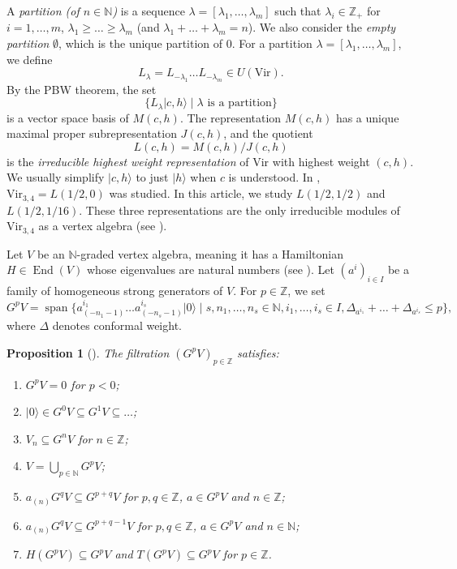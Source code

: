 \documentclass[a4paper, 12pt, reqno]{amsart}
\newtheorem{proposition}[theorem]{Proposition}
\theoremstyle{remark}
\DeclareMathOperator{\End}{End}
\DeclareMathOperator{\vspan}{span}
\newcommand{\vac}{{|0\rangle}}
\newcommand{\Vir}{{\mathrm{Vir}}}
\begin{document}
A \emph{partition (of $n \in \mathbb{N}$)} is a sequence $\lambda = [\lambda_1, \dots, \lambda_m]$ such that $\lambda_i \in \mathbb{Z}_+$ for $i = 1, \dots, m$, $\lambda_1 \ge \dots \ge \lambda_m$ (and $\lambda_1 + \dots + \lambda_m = n$).
We also consider the \emph{empty partition} $\emptyset$, which is the unique partition of $0$.
For a partition $\lambda = [\lambda_1, \dots, \lambda_m]$, we define
\begin{equation*}
  L_{\lambda} = L_{-\lambda_1}\dots L_{-\lambda_m} \in U(\Vir).
\end{equation*}
By the PBW theorem, the set
\begin{equation*}
  \{L_{\lambda}|c, h\rangle \mid \text{$\lambda$ is a partition}\}
\end{equation*}
is a vector space basis of $M(c, h)$.
The representation $M(c, h)$ has a unique maximal proper subrepresentation $J(c, h)$, and the quotient
\begin{equation*}
  L(c, h) = M(c, h)/J(c, h)
\end{equation*}
is the \emph{irreducible highest weight representation} of $\Vir$ with highest weight $(c, h)$.
We usually simplify $|c, h\rangle$ to just $|h\rangle$ when $c$ is understood.
In \cite{andrews_singular_2022}, $\Vir_{3, 4} = L(1/2, 0)$ was studied.
In this article, we study $L(1/2, 1/2)$ and $L(1/2, 1/16)$.
These three representations are the only irreducible modules of $\Vir_{3, 4}$ as a vertex algebra (see \cite[Theorem 4.2]{wang_rationality_1993}).

Let $V$ be an $\mathbb{N}$-graded vertex algebra, meaning it has a Hamiltonian $H \in \End(V)$ whose eigenvalues are natural numbers (see \cite[\S1.6]{de_sole_finite_2006}).
Let $(a^i)_{i \in I}$ be a family of homogeneous strong generators of $V$.
For $p \in \mathbb{Z}$, we set
\begin{equation*}
  G^pV = \vspan\{a^{i_1}_{(-n_1 - 1)}\dots a^{i_s}_{(-n_s - 1)}\vac \mid s, n_1, \dots, n_s \in \mathbb{N}, i_1, \dots, i_s \in I, \Delta_{a^{i_1}} + \dots + \Delta_{a^{i_s}} \le p\},
\end{equation*}
where $\Delta$ denotes conformal weight.

\begin{proposition}[{\cite{li_vertex_2004}}]
  \label{prp:1}
  The filtration $(G^pV)_{p \in \mathbb{Z}}$ satisfies:
  \begin{enumerate}
  \item $G^pV = 0$ for $p < 0$;
  \item $\vac \in G^0V \subseteq G^1V \subseteq \dots$;
  \item $V_n \subseteq G^nV$ for $n \in \mathbb{Z}$;
  \item $V = \bigcup_{p \in \mathbb{N}}G^pV$;
  \item $a_{(n)}G^qV \subseteq G^{p + q}V$ for $p, q \in \mathbb{Z}$, $a \in G^pV$ and $n \in \mathbb{Z}$;
  \item $a_{(n)}G^qV \subseteq G^{p + q - 1}V$ for $p, q \in \mathbb{Z}$, $a \in G^pV$ and $n \in \mathbb{N}$;
  \item $H(G^pV) \subseteq G^pV$ and $T(G^pV) \subseteq G^pV$ for $p \in \mathbb{Z}$.
  \end{enumerate}
\end{proposition}
\end{document}
